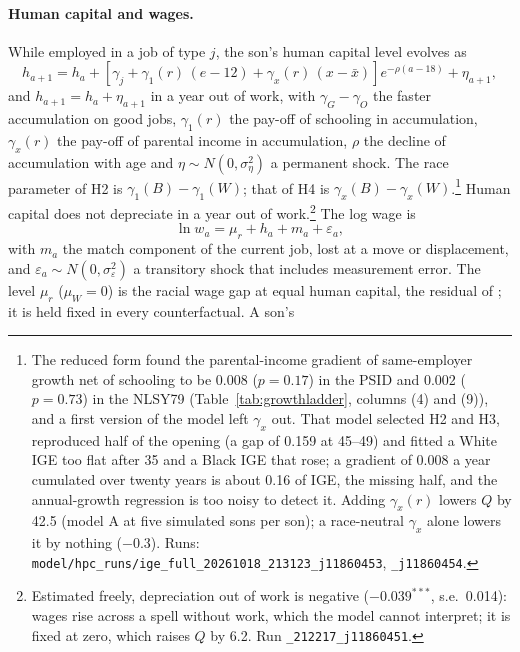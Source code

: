 \paragraph{Human capital and wages.} While employed in a job of type $j$, the son's human capital level evolves as
\begin{equation}\label{eq:modelhc}
h_{a+1} = h_a + \left[\gamma_j + \gamma_1(r)\, (e - 12) + \gamma_x(r)\, (x - \bar x)\right] e^{-\rho(a - 18)} +
\eta_{a+1},
\end{equation}
and $h_{a+1} = h_a + \eta_{a+1}$ in a year out of work, with $\gamma_G - \gamma_O$ the faster accumulation on good jobs,
$\gamma_1(r)$ the pay-off of schooling in accumulation, $\gamma_x(r)$ the pay-off of parental income in accumulation,
$\rho$ the decline of accumulation with age and $\eta \sim N(0, \sigma_\eta^2)$ a permanent shock. The race parameter of
H2 is $\gamma_1(B) - \gamma_1(W)$; that of H4 is $\gamma_x(B) - \gamma_x(W)$.\footnote{The reduced form found the
parental-income gradient of same-employer growth net of schooling to be 0.008 ($p = 0.17$) in the PSID and 0.002
($p = 0.73$) in the NLSY79 (Table~\ref{tab:growthladder}, columns (4) and (9)), and a first version of the model left $\gamma_x$ out. That model
selected H2 and H3, reproduced half of the opening (a gap of 0.159 at 45--49) and fitted a White IGE too flat after 35
and a Black IGE that rose; a gradient of 0.008 a year cumulated over twenty years is about 0.16 of IGE, the missing
half, and the annual-growth regression is too noisy to detect it. Adding $\gamma_x(r)$ lowers $Q$ by 42.5 (model A at
five simulated sons per son); a race-neutral $\gamma_x$ alone lowers it by nothing ($-0.3$). Runs:
\texttt{model/hpc\_runs/ige\_full\_20261018\_213123\_j11860453}, \texttt{\_j11860454}.} Human capital does not
depreciate in a year out of work.\footnote{Estimated freely, depreciation out of work is negative ($-0.039^{***}$,
s.e.\ 0.014): wages rise across a spell without work, which the model cannot interpret; it is fixed at zero, which
raises $Q$ by 6.2. Run \texttt{\_212217\_j11860451}.} The log wage is
\begin{equation}\label{eq:modelwage}
\ln w_a = \mu_r + h_a + m_a + \varepsilon_a ,
\end{equation}
with $m_a$ the match component of the current job, lost at a move or displacement, and $\varepsilon_a \sim N(0,
\sigma_\varepsilon^2)$ a transitory shock that includes measurement error. The level $\mu_r$ ($\mu_W = 0$) is the racial
wage gap at equal human capital, the residual of \citet{neal1996role}; it is held fixed in every counterfactual. A son's
